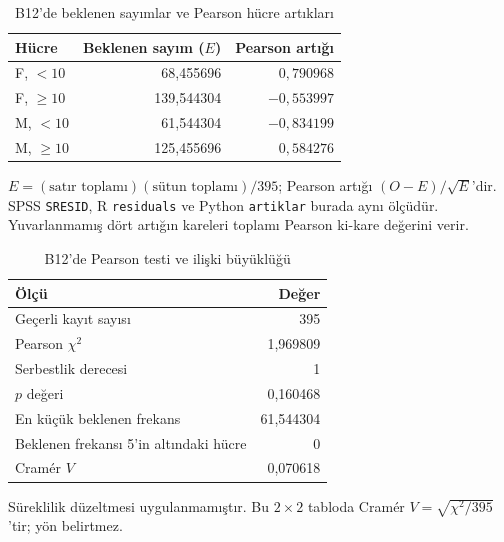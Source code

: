 \begin{table}[H]
\centering
\caption{B12'de beklenen sayımlar ve Pearson hücre artıkları}
\label{tab:b12-dogrulanmis-artik}
\begin{tabular}{@{}lrr@{}}
\toprule
Hücre & Beklenen sayım ($E$) & Pearson artığı \\
\midrule
F, $<10$ & 68,455696 & $0{,}790968$ \\
F, $\geq10$ & 139,544304 & $-0{,}553997$ \\
M, $<10$ & 61,544304 & $-0{,}834199$ \\
M, $\geq10$ & 125,455696 & $0{,}584276$ \\
\bottomrule
\end{tabular}
\par\smallskip
{\footnotesize $E=(\text{satır toplamı})(\text{sütun toplamı})/395$;
Pearson artığı $(O-E)/\sqrt{E}$'dir. SPSS \texttt{SRESID}, R
\texttt{residuals} ve Python \texttt{artiklar} burada aynı ölçüdür.
Yuvarlanmamış dört artığın kareleri toplamı Pearson ki-kare değerini verir.\par}
\end{table}

\begin{table}[H]
\centering
\caption{B12'de Pearson testi ve ilişki büyüklüğü}
\label{tab:b12-dogrulanmis-test}
\begin{tabular}{@{}lr@{}}
\toprule
Ölçü & Değer \\
\midrule
Geçerli kayıt sayısı & 395 \\
Pearson $\chi^2$ & 1,969809 \\
Serbestlik derecesi & 1 \\
$p$ değeri & 0,160468 \\
En küçük beklenen frekans & 61,544304 \\
Beklenen frekansı 5'in altındaki hücre & 0 \\
Cramér $V$ & 0,070618 \\
\bottomrule
\end{tabular}
\par\smallskip
{\footnotesize Süreklilik düzeltmesi uygulanmamıştır. Bu $2\times2$
tabloda Cramér $V=\sqrt{\chi^2/395}$'tir; yön belirtmez.\par}
\end{table}

